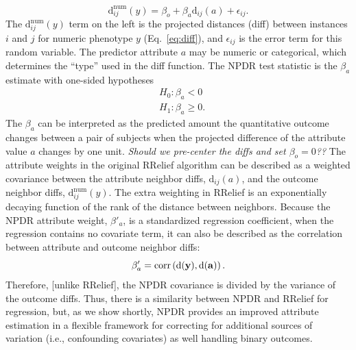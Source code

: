 \documentclass[10pt]{article}
\begin{document}
%
%
\begin{equation}\label{eq:lin_reg}
    \text{d}^{\text{num}}_{ij}(y) = \beta_{o} + \beta_{a} \text{d}_{ij}(a) + \epsilon_{ij}.
\end{equation}
The $\text{d}^{\text{num}}_{ij}(y)$ term on the left is the projected distances (diff) between instances $i$ and $j$ for numeric phenotype $y$ (Eq.~\ref{eq:diff}), and $\epsilon_{ij}$ is the error term for this random variable. The predictor attribute $a$ may be numeric or categorical, which determines the ``type'' used in the diff function. The NPDR test statistic is the $\beta_a$ estimate with one-sided hypotheses
\begin{equation}\label{eq:linreg_null}
\begin{aligned}
    & H_0: \beta_a < 0 \\
    & H_1: \beta_a \ge 0.
\end{aligned}
\end{equation}
The $\beta_a$ can be interpreted as the predicted amount the quantitative outcome changes between a pair of subjects when the projected difference of the attribute value $a$ changes by one unit. {\it Should we pre-center the diffs and set $\beta_o=0$??} The attribute weights in the original RRelief algorithm can be described as a weighted covariance between the attribute neighbor diffs, $\text{d}_{ij}(a)$, and the outcome neighbor diffs, $\text{d}^{\text{num}}_{ij}(y)$. The extra weighting in RRelief is an exponentially decaying function of the rank of the distance between neighbors. Because the NPDR attribute weight, $\beta'_a$, is a standardized regression coefficient, when the regression contains no covariate term, it can also be described as the correlation between attribute and outcome neighbor diffs:
\begin{equation}
\beta'_a = \text{corr}\left( \bf{\text{d}}(\bf{y}), \bf{\text{d}}(\bf{a}) \right).
\end{equation}
Therefore, [unlike RRelief], the NPDR covariance is divided by the variance of the outcome diffs. Thus, there is a similarity between NPDR and RRelief for regression, but, as we show shortly, NPDR provides an improved attribute estimation in a flexible framework for correcting for additional sources of variation (i.e., confounding covariates) as well handling binary outcomes.   
\end{document}
